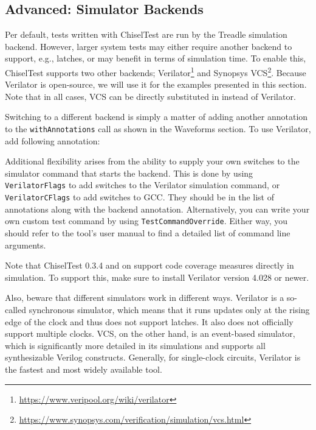 \documentclass[%
    10pt,
    headinclude, footexclude,
    openright, %
    notitlepage,
    cleardoubleempty,
    headsepline,
    pointlessnumbers,
    bibtotoc, idxtotoc,
    ]{scrbook}
\newcommand{\code}[1]{{\small{\texttt{#1}}}}
\newcommand{\myref}[2]{\href{#1}{#2}}
\renewcommand{\myref}[2]{{#2}{\footnote{\url{#1}}}}
\begin{document}
\subsection{Advanced: Simulator Backends}


Per default, tests written with ChiselTest are run by the Treadle simulation backend. However, 
larger system tests may either require another backend to support, e.g., latches, or may 
benefit in terms of simulation time. To enable this, ChiselTest supports two other backends; 
\myref{https://www.veripool.org/wiki/verilator}{Verilator} and 
\myref{https://www.synopsys.com/verification/simulation/vcs.html}{Synopsys VCS}. Because 
Verilator is open-source, we will use it for the examples presented in this section. Note 
that in all cases, VCS can be directly substituted in instead of Verilator.

Switching to a different backend is simply a matter of adding another annotation to the 
\code{withAnnotations} call as shown in the Waveforms section. To use Verilator, add following
annotation: 


Additional flexibility arises from the ability to supply your own switches to the 
simulator command that starts the backend. This is done by using \code{VerilatorFlags} 
to add switches to the Verilator simulation command, or \code{VerilatorCFlags} to add 
switches to GCC. They should be in the list of annotations along with the backend 
annotation. Alternatively, you can write your own custom test command by using 
\code{TestCommandOverride}. Either way, you should refer to the tool's user manual 
to find a detailed list of command line arguments.

Note that ChiselTest 0.3.4 and on support code coverage measures directly in simulation. 
To support this, make sure to install Verilator version 4.028 or newer.

Also, beware that different simulators work in different ways. Verilator is a so-called 
synchronous simulator, which means that it runs updates only at the rising edge of the 
clock and thus does not support latches. It also does not officially support multiple 
clocks. VCS, on the other hand, is an event-based simulator, which is significantly more 
detailed in its simulations and supports all synthesizable Verilog constructs. 
Generally, for single-clock circuits, Verilator is the fastest and 
most widely available tool.
\end{document}
